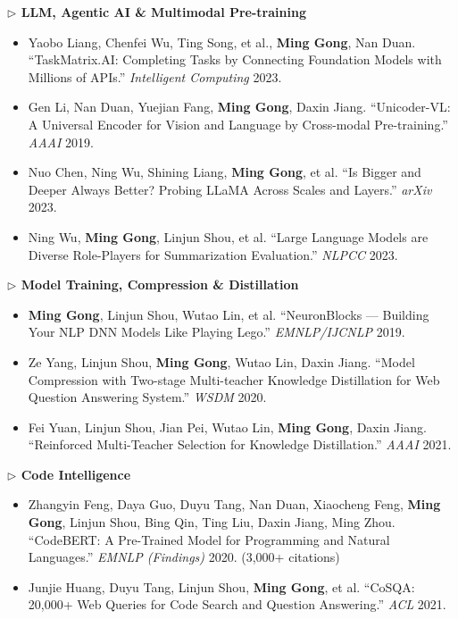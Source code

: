 \documentclass[10.5pt,letterpaper]{article}
\begin{document}
\noindent\textcolor{blue!60!black}{\textbf{$\triangleright$ LLM, Agentic AI \& Multimodal Pre-training}}
\begin{itemize}
  \item Yaobo Liang, Chenfei Wu, Ting Song, et al., \textbf{Ming Gong}, Nan Duan. ``TaskMatrix.AI: Completing Tasks by Connecting Foundation Models with Millions of APIs.'' \textit{Intelligent Computing} 2023.
  \item Gen Li, Nan Duan, Yuejian Fang, \textbf{Ming Gong}, Daxin Jiang. ``Unicoder-VL: A Universal Encoder for Vision and Language by Cross-modal Pre-training.'' \textit{AAAI} 2019.
  \item Nuo Chen, Ning Wu, Shining Liang, \textbf{Ming Gong}, et al. ``Is Bigger and Deeper Always Better? Probing LLaMA Across Scales and Layers.'' \textit{arXiv} 2023.
  \item Ning Wu, \textbf{Ming Gong}, Linjun Shou, et al. ``Large Language Models are Diverse Role-Players for Summarization Evaluation.'' \textit{NLPCC} 2023.
\end{itemize}

\noindent\textcolor{blue!60!black}{\textbf{$\triangleright$ Model Training, Compression \& Distillation}}
\begin{itemize}
  \item \textbf{Ming Gong}, Linjun Shou, Wutao Lin, et al. ``NeuronBlocks --- Building Your NLP DNN Models Like Playing Lego.'' \textit{EMNLP/IJCNLP} 2019.
  \item Ze Yang, Linjun Shou, \textbf{Ming Gong}, Wutao Lin, Daxin Jiang. ``Model Compression with Two-stage Multi-teacher Knowledge Distillation for Web Question Answering System.'' \textit{WSDM} 2020.
  \item Fei Yuan, Linjun Shou, Jian Pei, Wutao Lin, \textbf{Ming Gong}, Daxin Jiang. ``Reinforced Multi-Teacher Selection for Knowledge Distillation.'' \textit{AAAI} 2021.
\end{itemize}

\noindent\textcolor{blue!60!black}{\textbf{$\triangleright$ Code Intelligence}}
\begin{itemize}
  \item Zhangyin Feng, Daya Guo, Duyu Tang, Nan Duan, Xiaocheng Feng, \textbf{Ming Gong}, Linjun Shou, Bing Qin, Ting Liu, Daxin Jiang, Ming Zhou. ``CodeBERT: A Pre-Trained Model for Programming and Natural Languages.'' \textit{EMNLP (Findings)} 2020. (3,000+ citations)
  \item Junjie Huang, Duyu Tang, Linjun Shou, \textbf{Ming Gong}, et al. ``CoSQA: 20,000+ Web Queries for Code Search and Question Answering.'' \textit{ACL} 2021.
\end{itemize}
\end{document}
